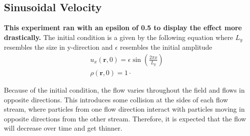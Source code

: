 \subsection{Sinusoidal Velocity}\label{subsec:sinusoidal-velocity}
\textbf{This experiment ran with an epsilon of 0.5 to display the effect more drastically.}
The initial condition is a given by the following equation where $L_y$ resembles the size in y-direction and $\epsilon$ resembles the initial amplitude
\begin{equation*}
    \begin{gathered}
        u_x(\mathbf{r},0) = \epsilon \sin \left( \frac{2 \pi x}{L_y} \right) \\
        \rho(\mathbf{r},0) = 1 \cdot
    \end{gathered}
\end{equation*}

Because of the initial condition, the flow varies throughout the field and flows in opposite directions.
This introduces some collision at the sides of each flow stream, where particles from one flow direction interact with particles moving in opposite directions from the other stream.
Therefore, it is expected that the flow will decrease over time and get thinner.

